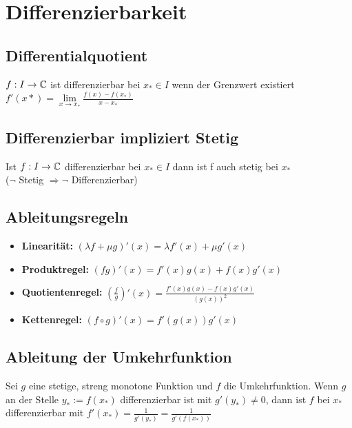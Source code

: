 \documentclass[german]{latex4ei/latex4ei_sheet}
\begin{document}
\section{Differenzierbarkeit}

\begin{sectionbox}
	\subsection{Differentialquotient}
	$f: I \rightarrow \mathbb C$ ist differenzierbar bei $x_* \in I $ wenn der Grenzwert existiert \\
	$f'(x*)= \lim \limits_{x \to x_*} \frac{f(x)-f(x_*)}{x-x_*}$

\end{sectionbox}

\begin{sectionbox}
	\subsection{Differenzierbar impliziert Stetig}
	Ist $f: I \rightarrow \mathbb C$ differenzierbar bei $ x_* \in I$ dann ist f auch stetig bei $x_*$ \\
	($\neg$ Stetig $\Rightarrow \neg$ Differenzierbar)

\end{sectionbox}

\begin{sectionbox}
	\subsection{Ableitungsregeln}
	\begin{itemize}
		\item \textbf{Linearität: } $(\lambda f + \mu g)'(x)=\lambda f'(x) + \mu g'(x)$
		\item \textbf{Produktregel: } $(fg)'(x)=f'(x)g(x)+f(x)g'(x)$
		\item \textbf{Quotientenregel: } $(\frac{f}{g})'(x)= \frac{f'(x)g(x)-f(x)g'(x)}{(g(x))^2}$
		\item \textbf{Kettenregel: } $(f \circ g)'(x)=f'(g(x))g'(x)$
	\end{itemize}

\end{sectionbox}

\begin{sectionbox}
	\subsection{Ableitung der Umkehrfunktion}
	Sei $g $ eine stetige, streng monotone Funktion und $f $ die Umkehrfunktion. Wenn $g$ an der Stelle $y_* := f(x_*)$ differenzierbar ist mit $g′(y_*) \neq 0$, dann ist $f$ bei $x_*$ differenzierbar mit $f'(x_*)=\frac{1}{g'(y_*)}=\frac{1}{g'(f(x_*))}$

\end{sectionbox}
\end{document}
